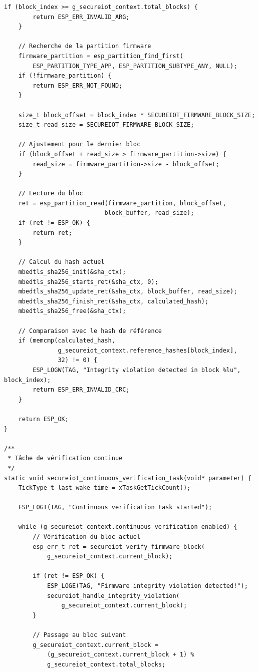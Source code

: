 \begin{lstlisting}[caption={Implémentation complète du module de vérification d'intégrité pour ESP32}]
    if (block_index >= g_secureiot_context.total_blocks) {
        return ESP_ERR_INVALID_ARG;
    }
    
    // Recherche de la partition firmware
    firmware_partition = esp_partition_find_first(
        ESP_PARTITION_TYPE_APP, ESP_PARTITION_SUBTYPE_ANY, NULL);
    if (!firmware_partition) {
        return ESP_ERR_NOT_FOUND;
    }
    
    size_t block_offset = block_index * SECUREIOT_FIRMWARE_BLOCK_SIZE;
    size_t read_size = SECUREIOT_FIRMWARE_BLOCK_SIZE;
    
    // Ajustement pour le dernier bloc
    if (block_offset + read_size > firmware_partition->size) {
        read_size = firmware_partition->size - block_offset;
    }
    
    // Lecture du bloc
    ret = esp_partition_read(firmware_partition, block_offset, 
                            block_buffer, read_size);
    if (ret != ESP_OK) {
        return ret;
    }
    
    // Calcul du hash actuel
    mbedtls_sha256_init(&sha_ctx);
    mbedtls_sha256_starts_ret(&sha_ctx, 0);
    mbedtls_sha256_update_ret(&sha_ctx, block_buffer, read_size);
    mbedtls_sha256_finish_ret(&sha_ctx, calculated_hash);
    mbedtls_sha256_free(&sha_ctx);
    
    // Comparaison avec le hash de référence
    if (memcmp(calculated_hash, 
               g_secureiot_context.reference_hashes[block_index], 
               32) != 0) {
        ESP_LOGW(TAG, "Integrity violation detected in block %lu", block_index);
        return ESP_ERR_INVALID_CRC;
    }
    
    return ESP_OK;
}

/**
 * Tâche de vérification continue
 */
static void secureiot_continuous_verification_task(void* parameter) {
    TickType_t last_wake_time = xTaskGetTickCount();
    
    ESP_LOGI(TAG, "Continuous verification task started");
    
    while (g_secureiot_context.continuous_verification_enabled) {
        // Vérification du bloc actuel
        esp_err_t ret = secureiot_verify_firmware_block(
            g_secureiot_context.current_block);
        
        if (ret != ESP_OK) {
            ESP_LOGE(TAG, "Firmware integrity violation detected!");
            secureiot_handle_integrity_violation(
                g_secureiot_context.current_block);
        }
        
        // Passage au bloc suivant
        g_secureiot_context.current_block = 
            (g_secureiot_context.current_block + 1) % 
            g_secureiot_context.total_blocks;
        

\end{lstlisting}
